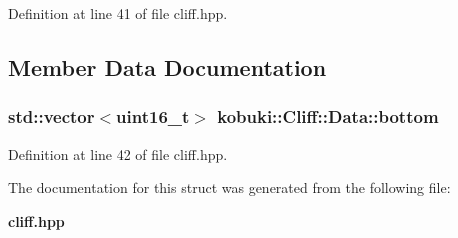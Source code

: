 \-Definition at line 41 of file cliff.\-hpp.



\subsection{\-Member \-Data \-Documentation}
\subsubsection[{bottom}]{\setlength{\rightskip}{0pt plus 5cm}std\-::vector$<$uint16\-\_\-t$>$ {\bf kobuki\-::\-Cliff\-::\-Data\-::bottom}}\label{structkobuki_1_1Cliff_1_1Data_addf367ef49803e8814f0e468d87b78ac}


\-Definition at line 42 of file cliff.\-hpp.



\-The documentation for this struct was generated from the following file\-:\begin{DoxyCompactItemize}
\item 
{\bf cliff.\-hpp}\end{DoxyCompactItemize}
